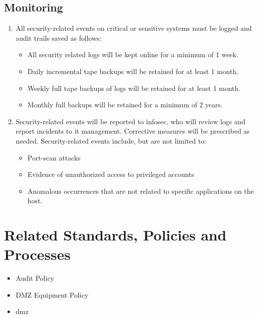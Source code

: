 \subsection{Monitoring}
\begin{enumerate}
\item
All security-related events on critical or sensitive systems must be logged and audit trails saved as follows: 
\begin{itemize}
\item
All security related logs will be kept online for a minimum of 1 week. 
\item
Daily incremental tape backups will be retained for at least 1 month. 
\item
Weekly full tape backups of logs will be retained for at least 1 month. 
\item
Monthly full backups will be retained for a minimum of 2 years. 
\end{itemize}
\item 
Security-related events will be reported to \gls{infosec}, who will review logs and report incidents to \gls{it} management.  
Corrective measures will be prescribed as needed.  
Security-related events include, but are not limited to: 
\begin{itemize}
\item
Port-scan attacks 
\item
Evidence of unauthorized access to privileged accounts 
\item
Anomalous occurrences that are not related to specific applications on the host. 
\end{itemize}
\end{enumerate}
\CommonPolicyCompliance
\section{Related Standards, Policies\oxford{} and Processes}
\begin{itemize}
\item
Audit Policy%
\item
DMZ Equipment Policy%
\end{itemize}
\CommonDefinitionsAndTerms
\begin{itemize}
\item \gls{dmz}
\end{itemize}
\CommonRevisionHistory
